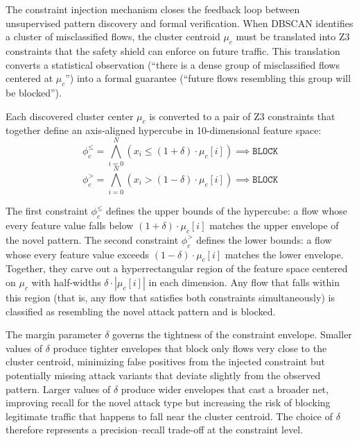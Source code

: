 \documentclass[12pt, letterpaper, oneside]{report}
\begin{document}
The constraint injection mechanism closes the feedback loop between unsupervised pattern discovery and formal verification. When DBSCAN identifies a cluster of misclassified flows, the cluster centroid $\mu_c$ must be translated into Z3 constraints that the safety shield can enforce on future traffic. This translation converts a statistical observation (``there is a dense group of misclassified flows centered at $\mu_c$'') into a formal guarantee (``future flows resembling this group will be blocked'').

Each discovered cluster center $\mu_c$ is converted to a pair of Z3 constraints that together define an axis-aligned hypercube in 10-dimensional feature space:
\begin{equation}
\label{eq:constraint_injection}
\phi_c^{\leq} = \bigwedge_{i=0}^{N} (x_i \leq (1+\delta) \cdot \mu_c[i]) \implies \texttt{BLOCK}
\end{equation}
\begin{equation}
\phi_c^{>} = \bigwedge_{i=0}^{N} (x_i > (1-\delta) \cdot \mu_c[i]) \implies \texttt{BLOCK}
\end{equation}

The first constraint $\phi_c^{\leq}$ defines the upper bounds of the hypercube: a flow whose every feature value falls below $(1+\delta) \cdot \mu_c[i]$ matches the upper envelope of the novel pattern. The second constraint $\phi_c^{>}$ defines the lower bounds: a flow whose every feature value exceeds $(1-\delta) \cdot \mu_c[i]$ matches the lower envelope. Together, they carve out a hyperrectangular region of the feature space centered on $\mu_c$ with half-widths $\delta \cdot |\mu_c[i]|$ in each dimension. Any flow that falls within this region (that is, any flow that satisfies both constraints simultaneously) is classified as resembling the novel attack pattern and is blocked.

The margin parameter $\delta$ governs the tightness of the constraint envelope. Smaller values of $\delta$ produce tighter envelopes that block only flows very close to the cluster centroid, minimizing false positives from the injected constraint but potentially missing attack variants that deviate slightly from the observed pattern. Larger values of $\delta$ produce wider envelopes that cast a broader net, improving recall for the novel attack type but increasing the risk of blocking legitimate traffic that happens to fall near the cluster centroid. The choice of $\delta$ therefore represents a precision--recall trade-off at the constraint level.
\end{document}
